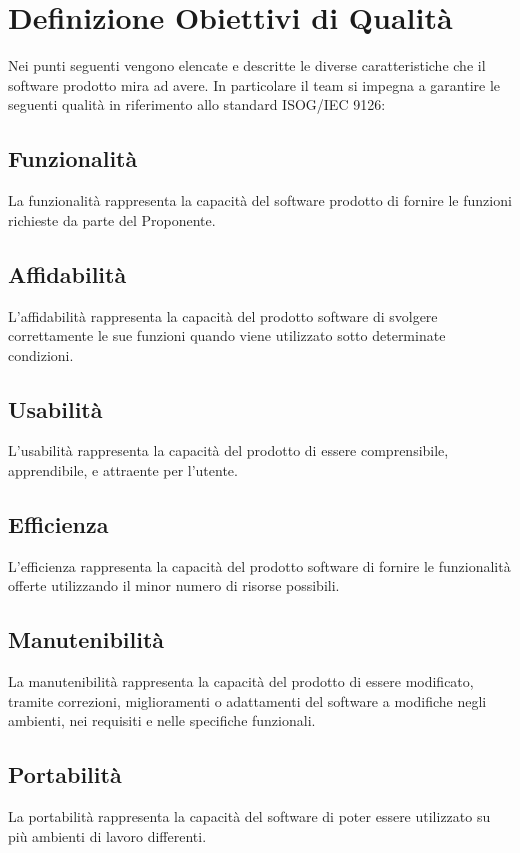 \section{Definizione Obiettivi di Qualità}
Nei punti seguenti vengono elencate e descritte le diverse caratteristiche che il software prodotto mira ad avere. In particolare il team si impegna a garantire le seguenti qualità in riferimento allo standard ISOG/IEC 9126:

\subsection{Funzionalità}
La funzionalità rappresenta la capacità del software prodotto di fornire le funzioni richieste da parte del Proponente.

\subsection{Affidabilità}
L’affidabilità rappresenta la capacità del prodotto software di svolgere correttamente le sue funzioni quando viene utilizzato sotto determinate condizioni.

\subsection{Usabilità}
L’usabilità rappresenta la capacità del prodotto di essere comprensibile, apprendibile, e attraente per l’utente.

\subsection{Efficienza}
L’efficienza rappresenta la capacità del prodotto software di fornire le funzionalità offerte utilizzando il minor numero di risorse possibili.

\subsection{Manutenibilità}
La manutenibilità rappresenta la capacità del prodotto di essere modificato, tramite correzioni, miglioramenti o adattamenti del software a modifiche negli ambienti, nei requisiti e nelle specifiche funzionali.

\subsection{Portabilità}
La portabilità rappresenta la capacità del software di poter essere utilizzato su più ambienti di lavoro differenti.
